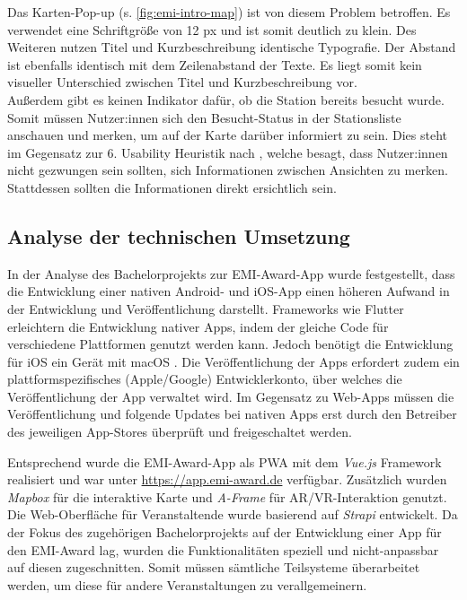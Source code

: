 Das Karten-Pop-up (s. \autoref{fig:emi-intro-map}) ist von diesem Problem
betroffen. Es verwendet eine Schriftgröße von 12 px und ist somit deutlich zu
klein. Des Weiteren nutzen Titel und Kurzbeschreibung identische Typografie. Der
Abstand ist ebenfalls identisch mit dem Zeilenabstand der Texte. Es liegt somit
kein visueller Unterschied zwischen Titel und Kurzbeschreibung vor. \\
Außerdem gibt es keinen Indikator dafür, ob die Station bereits besucht wurde.
Somit müssen Nutzer:innen sich den Besucht-Status in der Stationsliste anschauen
und merken, um auf der Karte darüber informiert zu sein. Dies steht im Gegensatz
zur 6. Usability Heuristik nach \textcite{Nielsen1994}, welche besagt, dass
Nutzer:innen nicht gezwungen sein sollten, sich Informationen zwischen Ansichten
zu merken. Stattdessen sollten die Informationen direkt ersichtlich sein.


\subsection{Analyse der technischen Umsetzung} \label{ssec:analysis-old-tech}

In der Analyse des Bachelorprojekts zur EMI-Award-App wurde festgestellt, dass
die Entwicklung einer nativen Android- und iOS-App einen höheren Aufwand in der
Entwicklung und Veröffentlichung darstellt. Frameworks wie Flutter
\cite{Google2022} erleichtern die Entwicklung nativer Apps, indem der gleiche
Code für verschiedene Plattformen genutzt werden kann. Jedoch benötigt die
Entwicklung für iOS ein Gerät mit macOS \cite{Apple2022}. Die Veröffentlichung
der Apps erfordert zudem ein plattformspezifisches (Apple/Google)
Entwicklerkonto, über welches die Veröffentlichung der App verwaltet wird. Im
Gegensatz zu Web-Apps müssen die Veröffentlichung und folgende Updates bei
nativen Apps erst durch den Betreiber des jeweiligen App-Stores überprüft und
freigeschaltet werden.

Entsprechend wurde die EMI-Award-App als \ac{PWA} mit dem \textit{Vue.js}
\cite{You2022a} Framework realisiert und war unter \url{https://app.emi-award.de}
verfügbar. Zusätzlich wurden \textit{Mapbox} \cite{Mapbox2022} für die
interaktive Karte und \textit{A-Frame} \cite{Supermedium2021} für
\ac{AR}/\ac{VR}-Interaktion genutzt. Die Web-Oberfläche für Veranstaltende wurde basierend
auf \textit{Strapi} \cite{Strapi2022} entwickelt. Da der Fokus des zugehörigen
Bachelorprojekts auf der Entwicklung einer App für den EMI-Award lag, wurden die
Funktionalitäten speziell und nicht-anpassbar auf diesen zugeschnitten. Somit
müssen sämtliche Teilsysteme überarbeitet werden, um diese für andere
Veranstaltungen zu verallgemeinern.



